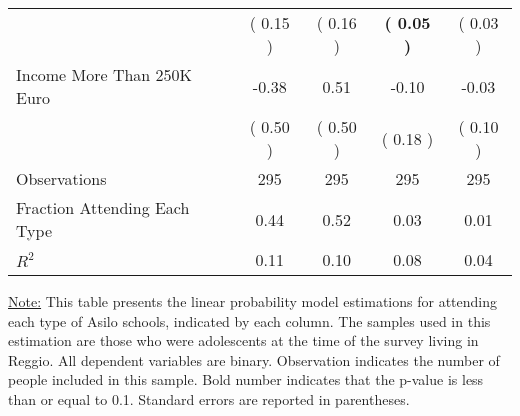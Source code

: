 \begin{table}[H]
{\begin{tabular}{lcccc}
\quad  & (     0.15 ) & (     0.16 )  & \textbf{(     0.05 )}  & (     0.03 )  \\
\quad Income More Than 250K Euro &     -0.38 &      0.51 &     -0.10 &     -0.03 \\
\quad  & (     0.50 ) & (     0.50 )  & (     0.18 )  & (     0.10 )  \\
\midrule
Observations & 295 & 295 & 295 & 295 \\
Fraction Attending Each Type &      0.44 &      0.52 &      0.03 &      0.01 \\
\midrule
$ R^2$ &      0.11 &      0.10 &      0.08 &      0.04 \\
\bottomrule
\end{tabular}}
\end{table}
\begin{scriptsize}
\noindent\underline{Note:} This table presents the linear probability model estimations for attending each type of Asilo schools, indicated by each column. The samples used in this estimation are those who were adolescents at the time of the survey living in Reggio. All dependent variables are binary. Observation indicates the number of people included in this sample. Bold number indicates that the p-value is less than or equal to 0.1. Standard errors are reported in parentheses.
\end{scriptsize}
